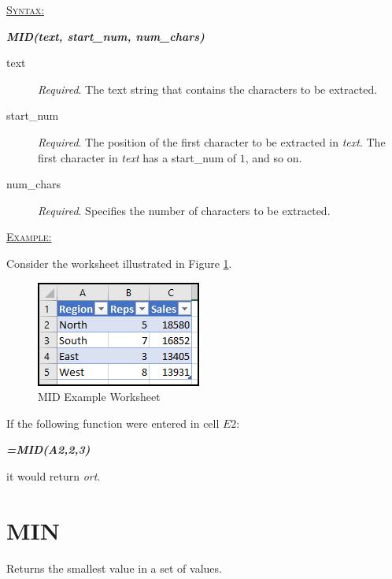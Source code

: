 \begin{addmargin}[1cm]{0cm}
	
	\medskip
	\underline{\textsc{Syntax:}}
	\medskip
	
	{\color{Syntax}
		\noindent\textbf{\textit{MID(text, start\_num, num\_chars)}}
	}
	
	\begin{description}
		\item[text] \textit{Required}. The text string that contains the characters to be extracted.
		\item[start\_num] \textit{Required}. The position of the first character to be extracted in \textit{text}. The first character in \textit{text} has a start\_num of $ 1 $, and so on.
		\item[num\_chars] \textit{Required}. Specifies the number of characters to be extracted. 
	\end{description}

	\medskip
	\noindent\underline{\textsc{Example:}}
	\medskip
	
	\noindent Consider the worksheet illustrated in Figure \ref{apa:mid}.
	
	\begin{figure}[H]
		\centering
		\includegraphics[width=\maxwidth{.45\linewidth}]{gfx/apa_fig01}
		\caption{MID Example Worksheet}
		\label{apa:mid}
	\end{figure}
	
	\noindent If the following function were entered in cell $ E2 $:
	
	{\color{Syntax}
		\textit{\textbf{=MID(A2,2,3)}}
	}
	
	\noindent it would return \textit{ort}.

\end{addmargin}

\section{MIN}

Returns the smallest value in a set of values. 

